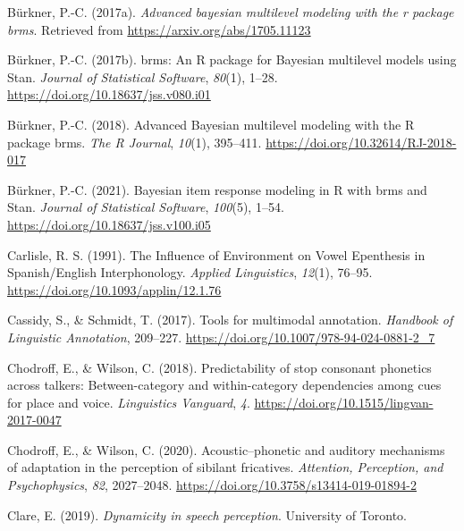 \documentclass[
  11pt,
  english,
  man,floatsintext]{apa6}
\newlength{\cslhangindent}
\newlength{\cslentryspacingunit} %
\newenvironment{CSLReferences}[2] %
 {%
  \setlength{\parindent}{0pt}
  \ifodd #1
  \let\oldpar\par
  \def\par{\hangindent=\cslhangindent\oldpar}
  \fi
  \setlength{\parskip}{#2\cslentryspacingunit}
 }%
 {}
\begin{document}
\begin{CSLReferences}{1}{0}
\leavevmode{}%
Bürkner, P.-C. (2017a). \emph{Advanced bayesian multilevel modeling with the r package brms}. Retrieved from \url{https://arxiv.org/abs/1705.11123}

\leavevmode{}%
Bürkner, P.-C. (2017b). {brms}: An {R} package for {Bayesian} multilevel models using {Stan}. \emph{Journal of Statistical Software}, \emph{80}(1), 1--28. \url{https://doi.org/10.18637/jss.v080.i01}

\leavevmode{}%
Bürkner, P.-C. (2018). Advanced {Bayesian} multilevel modeling with the {R} package {brms}. \emph{The R Journal}, \emph{10}(1), 395--411. \url{https://doi.org/10.32614/RJ-2018-017}

\leavevmode{}%
Bürkner, P.-C. (2021). Bayesian item response modeling in {R} with {brms} and {Stan}. \emph{Journal of Statistical Software}, \emph{100}(5), 1--54. \url{https://doi.org/10.18637/jss.v100.i05}

\leavevmode{}%
Carlisle, R. S. (1991). {The Influence of Environment on Vowel Epenthesis in Spanish/English Interphonology}. \emph{Applied Linguistics}, \emph{12}(1), 76--95. \url{https://doi.org/10.1093/applin/12.1.76}

\leavevmode{}%
Cassidy, S., \& Schmidt, T. (2017). Tools for multimodal annotation. \emph{Handbook of Linguistic Annotation}, 209--227. \url{https://doi.org/10.1007/978-94-024-0881-2_7}

\leavevmode{}%
Chodroff, E., \& Wilson, C. (2018). Predictability of stop consonant phonetics across talkers: Between-category and within-category dependencies among cues for place and voice. \emph{Linguistics Vanguard}, \emph{4}. \url{https://doi.org/10.1515/lingvan-2017-0047}

\leavevmode{}%
Chodroff, E., \& Wilson, C. (2020). Acoustic--phonetic and auditory mechanisms of adaptation in the perception of sibilant fricatives. \emph{Attention, Perception, and Psychophysics}, \emph{82}, 2027--2048. \url{https://doi.org/10.3758/s13414-019-01894-2}

\leavevmode{}%
Clare, E. (2019). \emph{Dynamicity in speech perception}. University of Toronto.


\end{CSLReferences}
\end{document}
